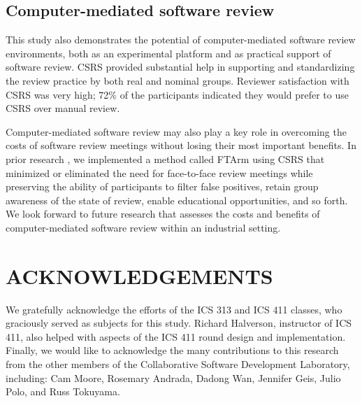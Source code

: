 \subsection{Computer-mediated software review}

This study also demonstrates the potential of computer-mediated software
review environments, both as an experimental platform and as practical
support of software review. CSRS provided substantial help in 
supporting and standardizing the review practice by both real and nominal
groups.  Reviewer satisfaction with CSRS was very high; 72\% of the 
participants indicated they would prefer to use CSRS over manual review.

Computer-mediated software review may also play a key role in overcoming
the costs of software review meetings without losing their most important
benefits. In prior research \cite{Johnson94}, we implemented a method
called FTArm using CSRS that minimized or eliminated the need for
face-to-face review meetings while preserving the ability of participants
to filter false positives, retain group awareness of the state of review,
enable educational opportunities, and so forth.  We look forward to 
future research that assesses the costs and benefits of computer-mediated
software review within an industrial setting. 


\section{ACKNOWLEDGEMENTS} 

We gratefully acknowledge the efforts of the ICS 313 and ICS 411 classes,
who graciously served as subjects for this study.  Richard Halverson,
instructor of ICS 411, also helped with aspects of the ICS 411 round design
and implementation.  Finally, we would like to acknowledge the many
contributions to this research from the other members of the Collaborative
Software Development Laboratory, including: Cam Moore, Rosemary Andrada,
Dadong Wan, Jennifer Geis, Julio Polo, and Russ Tokuyama.










